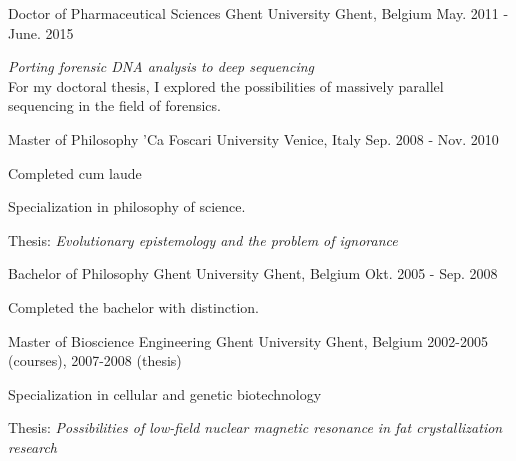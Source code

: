 

\begin{cventries}

  \cventry
    {Doctor of Pharmaceutical Sciences} %
    {Ghent University} %
    {Ghent, Belgium} %
    {May. 2011 - June. 2015} %
    {
      \begin{cvitems} %
      \item {\emph{Porting forensic DNA analysis to deep sequencing}
          \\ For my doctoral thesis, I explored the possibilities of
          massively parallel sequencing in the field of forensics.}
      \end{cvitems}
    }

  \cventry
    {Master of Philosophy} %
    {'Ca Foscari University} %
    {Venice, Italy} %
    {Sep. 2008 - Nov. 2010} %
    {
      \begin{cvitems} %
      \item {Completed cum laude}
      \item {Specialization in philosophy of science.}
      \item {Thesis: \emph{Evolutionary epistemology and the problem
            of ignorance}}
      \end{cvitems}
    }

  \cventry
    {Bachelor of Philosophy} %
    {Ghent University} %
    {Ghent, Belgium} %
    {Okt. 2005 - Sep. 2008} %
    {
      \begin{cvitems} %
        \item {Completed the bachelor with distinction.}
      \end{cvitems}
    }

  \cventry
    {Master of Bioscience Engineering} %
    {Ghent University} %
    {Ghent, Belgium} %
    {2002-2005 (courses), 2007-2008 (thesis)} %
    {
      \begin{cvitems} %
        \item {Specialization in cellular and genetic biotechnology}
        \item {Thesis: \emph{Possibilities of low-field nuclear
              magnetic resonance in fat crystallization research}}
      \end{cvitems}
    }


\end{cventries}
